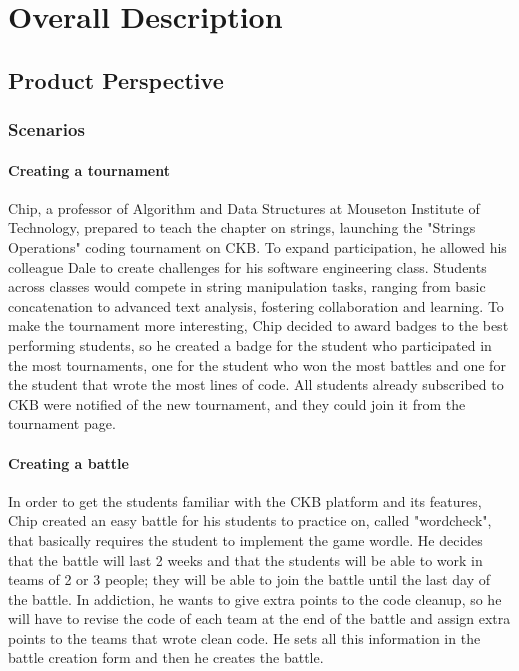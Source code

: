\chapter{Overall Description}
\section{Product Perspective}
\subsection{Scenarios}

\subsubsection{Creating a tournament}
Chip, a professor of Algorithm and Data Structures at Mouseton Institute of Technology, prepared to teach the chapter on strings, launching the "Strings Operations" coding tournament on CKB.
To expand participation, he allowed his colleague Dale to create challenges for his software engineering class.
Students across classes would compete in string manipulation tasks, ranging from basic concatenation to advanced text analysis, fostering collaboration and learning.
To make the tournament more interesting, Chip decided to award badges to the best performing students, so he created a badge for the student who participated in the most tournaments, one for the student who won the most battles and one for the student that wrote the most lines of code.
All students already subscribed to CKB were notified of the new tournament, and they could join it from the tournament page.

\subsubsection{Creating a battle}
In order to get the students familiar with the CKB platform and its features, Chip created an easy battle for his students to practice on, called "wordcheck", that basically requires the student to implement the game wordle.
He decides that the battle will last 2 weeks and that the students will be able to work in teams of 2 or 3 people; they will be able to join the battle until the last day of the battle.
In addiction, he wants to give extra points to the code cleanup, so he will have to revise the code of each team at the end of the battle and assign extra points to the teams that wrote clean code.
He sets all this information in the battle creation form and then he creates the battle.

